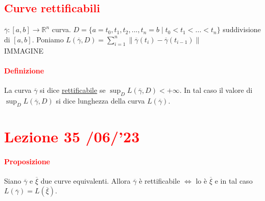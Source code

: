 \documentclass{article}
\newcommand{\R}{\mathbb{R}}
\begin{document}
\subsection{\textcolor{red}{Curve rettificabili}}
$\overline{\gamma}:[a,b]\rightarrow\R^n$ curva. $D=\{a=t_0,t_1,t_2,...,t_n=b\mid t_0<t_1<...<t_n\}$ suddivisione di $[a,b]$. Poniamo $L(\overline{\gamma},D)=\sum_{i=1}^{n}\| \overline{\gamma}(t_i)-\overline{\gamma}(t_{i-1}) \|$\\
IMMAGINE

\paragraph{\textcolor{red}{Definizione}}
La curva $\overline{\gamma}$ si dice \underline{rettificabile} se $\sup_D L(\overline{\gamma},D)<+\infty$. In tal caso il valore di $\sup_D L(\overline{\gamma},D)$ si dice lunghezza della curva $L(\overline{\gamma})$.

\newpage
\section{\textcolor{red}{Lezione 35 \space{}/06/'23}}
\paragraph{\textcolor{red}{Proposizione}}
Siano $\overline{\gamma}$ e $\overline{\xi}$ due curve equivalenti. Allora $\overline{\gamma}$ è rettificabile $\Leftrightarrow $ lo è $\overline{\xi}$ e in tal caso $L(\overline{\gamma})=L(\overline{\xi})$.
\end{document}
